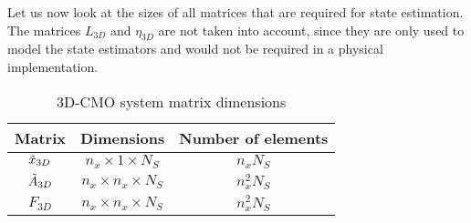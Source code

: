 Let us now look at the sizes of all matrices that are required for state estimation. The matrices $L_{3D}$ and $\eta_{3D}$ are not taken into account, since they are only used to model the state estimators and would not be required in a physical implementation.
\begin{table}[h]
    \centering
    \begin{tabular}{|c|c|c|}
        \toprule
        Matrix  & Dimensions & Number of elements \\
        \midrule
        $\Tilde{x}_{3D}$  & $ n_x \times 1 \times N_S$ & $n_xN_S$ \\
        $\Tilde{A}_{3D}$ & $n_x \times n_x \times N_S$ & $n_x^2N_S$ \\ 
        $F_{3D}$ & $n_x \times n_x \times N_S$ & $n_x^2N_S$ \\
        \bottomrule
    \end{tabular}
    \caption{3D-CMO system matrix dimensions}
    \label{tab:3D-CMO-dimensions}
\end{table}


